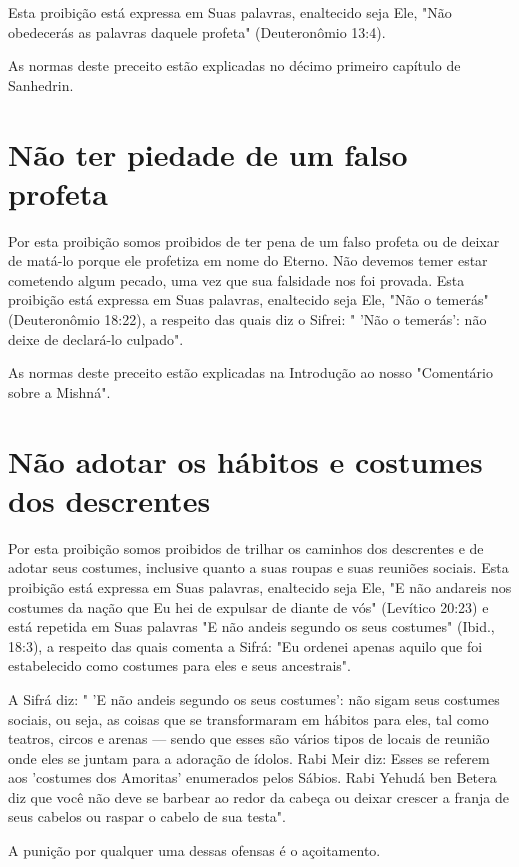 \begin{itemize}
\begin{enumrate}
\begin{itemize}
\begin{itemize}
\begin{itemize}
Esta proibição está expressa em Suas palavras, enaltecido seja Ele, "Não
obedecerás as palavras daquele profeta" (Deuteronômio 13:4).

As normas deste preceito estão explicadas no décimo primeiro capí­tulo
de Sanhedrin.

\section{Não ter piedade de um falso profeta}

Por esta proibição somos proibidos de ter pena de um falso profeta ou de
deixar de matá-lo porque ele profetiza em nome do Eterno. Não deve­mos
temer estar cometendo algum pecado, uma vez que sua falsidade nos foi
provada. Esta proibição está expressa em Suas palavras, enaltecido seja
Ele, "Não o temerás" (Deuteronômio 18:22), a respeito das quais diz o
Sifrei: " 'Não o temerás': não deixe de declará-lo culpado".

As normas deste preceito estão explicadas na Introdução ao nosso
"Comentário sobre a Mishná".

\section{Não adotar os hábitos e costumes dos descrentes}

Por esta proibição somos proibidos de trilhar os caminhos dos
des­crentes e de adotar seus costumes, inclusive quanto a suas roupas e
suas reu­niões sociais. Esta proibição está expressa em Suas palavras,
enaltecido seja Ele, "E não andareis nos costumes da nação que Eu hei de
expulsar de diante de vós" (Levítico 20:23) e está repetida em Suas
palavras "E não andeis segundo os seus costumes" (Ibid., 18:3), a
respeito das quais comenta a Sifrá: "Eu ordenei ape­nas aquilo que foi
estabelecido como costumes para eles e seus ancestrais".

A Sifrá diz: " 'E não andeis segundo os seus costumes': não sigam seus
costumes sociais, ou seja, as coisas que se transformaram em hábitos
para eles, tal como teatros, circos e arenas --- sendo que esses são
vários tipos de locais de reunião onde eles se juntam para a adoração de
ídolos. Rabi Meir diz: Esses se referem aos 'costumes dos Amoritas'
enumerados pelos Sábios. Rabi Yehudá ben Betera diz que você não deve se
barbear ao redor da cabeça ou deixar crescer a franja de seus cabelos ou
raspar o cabelo de sua testa".

A punição por qualquer uma dessas ofensas é o açoitamento.


\end{itemize}
\end{itemize}
\end{itemize}
\end{enumrate}
\end{itemize}
